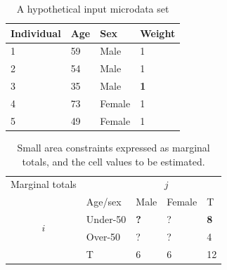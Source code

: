 \documentclass[a4paper, 11pt, twoside]{article}
\begin{document}
\begin{table}[h]
\caption{A hypothetical input microdata set
}
\label{t:w}
\begin{center}
 \begin{tabular}{llll}
\toprule
{Individual } & {Age} & {Sex}  & {Weight} \\
\midrule
1 & 59 & Male  & 1 \\
2 & 54 & Male & 1 \\
3 & {35} & {Male} & \textbf{1} \\
4 & 73 & Female & 1 \\
5 & 49 & Female & 1 \\
\bottomrule
\end{tabular}
\end{center}
\end{table}

\begin{table}[H]
\end{table}
\vspace{1cm}

\begin{table}[h]
\centering
\caption[Small area constraints expressed as marginal totals]{Small
area constraints expressed as marginal totals, and the cell
values to be estimated.}
\begin{tabular}{cllll}\toprule
Marginal totals&  & \multicolumn{2}{c}{$j$} & \\
& Age/sex & Male & Female & T\\ \midrule
\multirow{2}{*}{$i$} & Under-50 & \textbf{?} & ? & \textbf{8}\\
& Over-50 & ? & ? &4 \\
& T & 6 & 6 &12\\
\bottomrule
\end{tabular}
\label{t:s2}
\end{table}
\end{document}
